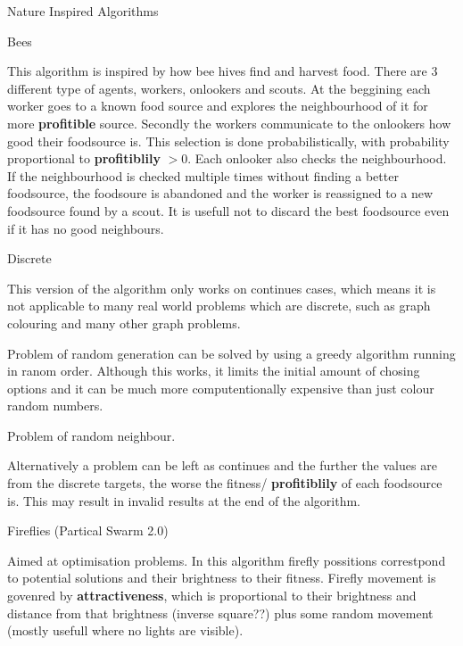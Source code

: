 \documentclass[12pt, letterpaper]{article}
\begin{document}
\begin{section}{Nature Inspired Algorithms}

  \begin{subsection}{Bees}

    This algorithm is inspired by how bee hives find and harvest food. There
    are 3 different type of agents, workers, onlookers and scouts. At the
    beggining each worker goes to a known food source and explores the
    neighbourhood of it for more \textbf{profitible} source. Secondly the
    workers communicate to the onlookers how good their foodsource is. This
    selection is done probabilistically, with probability proportional to
    \textbf{profitiblily} \( > 0\). Each onlooker also checks the
    neighbourhood. If the neighbourhood is checked multiple times without
    finding a better foodsource, the foodsoure is abandoned and the worker is
    reassigned to a new foodsource found by a scout. It is usefull not to
    discard the best foodsource even if it has no good neighbours.

    \begin{subsubsection}{Discrete}

      This version of the algorithm only works on continues cases, which means
      it is not applicable to many real world problems which are discrete, such
      as graph colouring and many other graph problems.

      Problem of random generation can be solved by using a greedy algorithm
      running in ranom order. Although this works, it limits the initial amount
      of chosing options and it can be much more computentionally expensive
      than just colour random numbers.

      Problem of random neighbour.

      Alternatively a problem can be left as continues and the further the
      values are from the discrete targets, the worse the fitness/
      \textbf{profitiblily} of each foodsource is. This may result in invalid
      results at the end of the algorithm.

    \end{subsubsection}

  \end{subsection}

  \begin{subsection}{Fireflies (Partical Swarm 2.0)}

    Aimed at optimisation problems. In this algorithm firefly possitions
    correstpond to potential solutions and their brightness to their fitness.
    Firefly movement is govenred by \textbf{attractiveness}, which is
    proportional to their brightness and distance from that brightness (inverse
    square??) plus some random movement (mostly usefull where no lights are
    visible).


\end{subsection}
\end{section}
\end{document}
